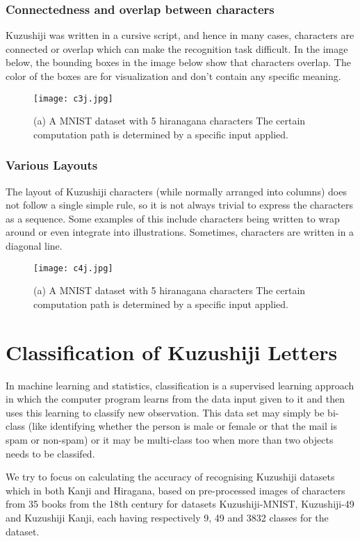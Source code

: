 \documentclass[12pt]{report}
\begin{document}
\subsection{Connectedness and overlap between characters}
Kuzushiji was written in a cursive script, and hence in many cases,
characters are connected or overlap which can make the recognition
task difficult.
In the image below, the bounding boxes in the image below show that
characters overlap. The color of the boxes are for visualization and
don’t contain any specific meaning.
\begin{figure}[h]
\centering
\texttt{[image: c3j.jpg]}
\caption{(a) A MNIST dataset with 5 hiranagana characters
The certain computation path is determined by a specific input applied.}
\end{figure}

\subsection{Various Layouts}
The layout of Kuzushiji characters (while normally arranged into
columns) does not follow a single simple rule, so it is not always
trivial to express the characters as a sequence. Some examples of this
include characters being written to wrap around or even integrate into
illustrations. Sometimes, characters are written in a diagonal line.
\begin{figure}[h]
\centering
\texttt{[image: c4j.jpg]}
\caption{(a) A MNIST dataset with 5 hiranagana characters
The certain computation path is determined by a specific input applied.}
\end{figure}

\chapter{Classification of Kuzushiji Letters}

In machine learning and statistics, classification is a supervised learning
approach in which the computer program learns from the data input
given to it and
then uses this learning to classify new observation. This data set may simply be
bi-class (like identifying whether the person is male or female or
that the mail is
spam or non-spam) or it may be multi-class too when more than two objects needs
to be classifed.

We try to focus on calculating the accuracy of recognising Kuzushiji
datasets which in both Kanji and Hiragana, based on pre-processed images of
characters from 35 books from the 18th century for datasets Kuzushiji-MNIST,
Kuzushiji-49 and Kuzushiji Kanji, each having respectively 9, 49 and
3832 classes
for the dataset.
\end{document}
